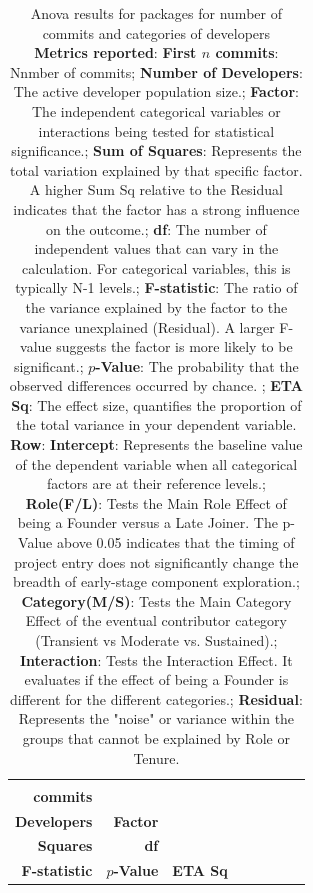 \begin{table}[H]
\centering
\setlength{\tabcolsep}{2pt}
\caption[Standard Anova Results for packages]{Anova results for packages for number of commits and categories of developers\\ \textbf{Metrics reported}:   \textbf{First $n$ commits}: Nnmber of commits;  \textbf{Number of Developers}: The active developer population size.;  \textbf{Factor}: The independent categorical variables or interactions being tested for statistical significance.;  \textbf{Sum of Squares}: Represents the total variation explained by that specific factor. A higher Sum Sq relative to the Residual indicates that the factor has a strong influence on the outcome.;  \textbf{df}: The number of independent values that can vary in the calculation. For categorical variables, this is typically N-1 levels.;  \textbf{F-statistic}: The ratio of the variance explained by the factor to the variance unexplained (Residual). A larger F-value suggests the factor is more likely to be significant.;  \textbf{$p$-Value}: The probability that the observed differences occurred by chance. ;  \textbf{ETA Sq}: The effect size, quantifies the proportion of the total variance in your dependent variable.
\\ \textbf{Row}:   \textbf{Intercept}: Represents the baseline value of the dependent variable when all categorical factors are at their reference levels.;  \textbf{Role(F/L)}: Tests the Main Role Effect of being a Founder versus a Late Joiner. The p-Value above 0.05 indicates that the timing of project entry does not significantly change the breadth of early-stage component exploration.;  \textbf{Category(M/S)}: Tests the Main Category Effect of the eventual contributor category (Transient vs Moderate vs. Sustained).;  \textbf{Interaction}: Tests the Interaction Effect. It evaluates if the effect of being a Founder is different for the different categories.;  \textbf{Residual}: Represents the "noise" or variance within the groups that cannot be explained by Role or Tenure.
}
\begin{tabular}{r r l r r r r r}
\toprule
\makecell[t]{\textbf{First $n$}\\\textbf{commits}} & \makecell[t]{\textbf{Number of}\\\textbf{Developers}} & \textbf{Factor} & \makecell[t]{\textbf{Sum of}\\\textbf{Squares}} & \textbf{df} & \makecell[t]{\textbf{}\\\textbf{F-statistic}} & \textbf{$p$-Value} & \textbf{ETA Sq} \\ 

\end{tabular}
\end{table}
